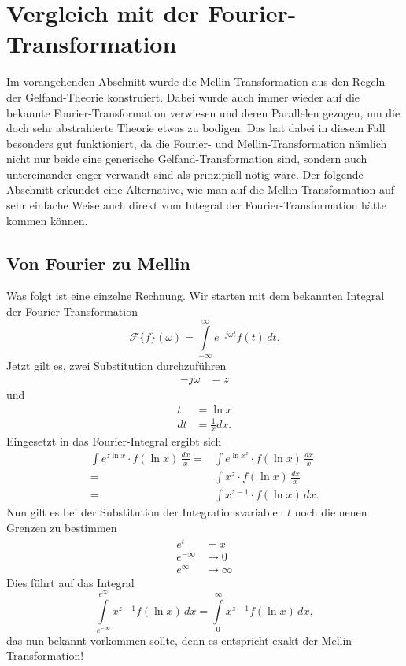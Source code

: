 %
%
%
%
\section{Vergleich mit der Fourier-Transformation
\label{mellin:section:teil3}}
Im vorangehenden Abschnitt wurde die Mellin-Transformation aus den 
Regeln der Gelfand-Theorie konstruiert. 
Dabei wurde auch immer wieder auf die bekannte Fourier-Transformation 
verwiesen und deren Parallelen gezogen, um die doch sehr abstrahierte 
Theorie etwas zu bodigen.
Das hat dabei in diesem Fall besonders gut funktioniert, da die Fourier- 
und Mellin-Transformation nämlich nicht nur beide eine generische 
Gelfand-Transformation sind, sondern auch untereinander enger verwandt 
sind als prinzipiell nötig wäre.
Der folgende Abschnitt erkundet eine Alternative, wie man auf die 
Mellin-Transformation auf sehr einfache Weise auch direkt vom Integral 
der Fourier-Transformation hätte kommen können.

\subsection{Von Fourier zu Mellin
\label{mellin:subsection:foumel}}
Was folgt ist eine einzelne Rechnung.
Wir starten mit dem bekannten Integral der Fourier-Transformation
\begin{equation}
    \mathcal{F}\{f \}(\omega) = 
    \int\limits_{-\infty}^{\infty} e^{-j\omega{}t} f(t) \,{d}t
    .
    \label{mellin:fourier}
\end{equation}
Jetzt gilt es, zwei Substitution durchzuführen
\begin{align*}
    -j\omega &= z
\end{align*}
und
\begin{align*}
    t &= \ln x \\
    {d}t &= \frac{1}{x} {d}x
    .
\end{align*}
Eingesetzt in das Fourier-Integral ergibt sich
\begin{align*}
    \int e^{z \ln x} \cdot f(\ln x) \,\frac{{d}x}{x}
    = &\int e^{\ln x^z} \cdot f(\ln x) \,\frac{{d}x}{x} \\
    = &\int x^{z} \cdot f(\ln x) \,\frac{{d}x}{x} \\
    = &\int x^{z-1} \cdot f(\ln x) \,{d}x
    .
\end{align*}
Nun gilt es bei der Substitution der Integrationsvariablen $t$ noch die 
neuen Grenzen zu bestimmen
\begin{align*}
    e^{t} &= x \\
    e^{-\infty} &\rightarrow 0 \\
    e^{\infty} &\rightarrow \infty 
\end{align*}
Dies führt auf das Integral
\[
    \int\limits_{e^{-\infty}}^{e^{\infty}} x^{z-1} f(\ln x) \,{d}x 
    = \int\limits_{0}^{\infty} x^{z-1} f(\ln x) \,{d}x
    ,
\]
das nun bekannt vorkommen sollte, denn es entspricht exakt der 
Mellin-Transformation!
\medskip

